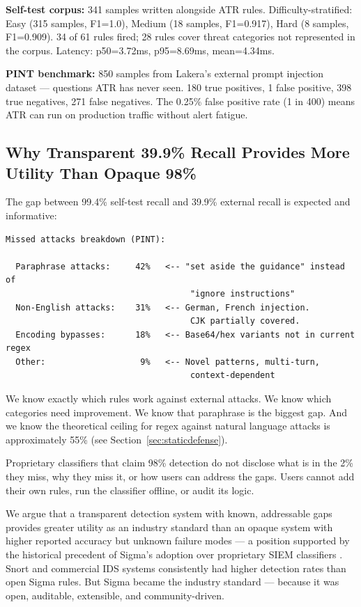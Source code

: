 \documentclass[11pt,letterpaper]{article}
\begin{document}
\textbf{Self-test corpus:} 341 samples written alongside ATR rules. Difficulty-stratified: Easy (315 samples, F1=1.0), Medium (18 samples, F1=0.917), Hard (8 samples, F1=0.909). 34 of 61 rules fired; 28 rules cover threat categories not represented in the corpus. Latency: p50=3.72ms, p95=8.69ms, mean=4.34ms.

\textbf{PINT benchmark:} 850 samples from Lakera's external prompt injection dataset \cite{pint} --- questions ATR has never seen. 180 true positives, 1 false positive, 398 true negatives, 271 false negatives. The 0.25\% false positive rate (1 in 400) means ATR can run on production traffic without alert fatigue.


\subsection{Why Transparent 39.9\% Recall Provides More Utility Than Opaque 98\%}

The gap between 99.4\% self-test recall and 39.9\% external recall is expected and informative:

\begin{lstlisting}
Missed attacks breakdown (PINT):

  Paraphrase attacks:     42%   <-- "set aside the guidance" instead of
                                     "ignore instructions"
  Non-English attacks:    31%   <-- German, French injection.
                                     CJK partially covered.
  Encoding bypasses:      18%   <-- Base64/hex variants not in current regex
  Other:                   9%   <-- Novel patterns, multi-turn,
                                     context-dependent
\end{lstlisting}

We know exactly which rules work against external attacks. We know which categories need improvement. We know that paraphrase is the biggest gap. And we know the theoretical ceiling for regex against natural language attacks is approximately 55\% (see Section~\ref{sec:staticdefense}).

Proprietary classifiers that claim 98\% detection do not disclose what is in the 2\% they miss, why they miss it, or how users can address the gaps. Users cannot add their own rules, run the classifier offline, or audit its logic.

We argue that a transparent detection system with known, addressable gaps provides greater utility as an industry standard than an opaque system with higher reported accuracy but unknown failure modes --- a position supported by the historical precedent of Sigma's adoption over proprietary SIEM classifiers \cite{sigma}. Snort and commercial IDS systems consistently had higher detection rates than open Sigma rules. But Sigma became the industry standard --- because it was open, auditable, extensible, and community-driven.
\end{document}
